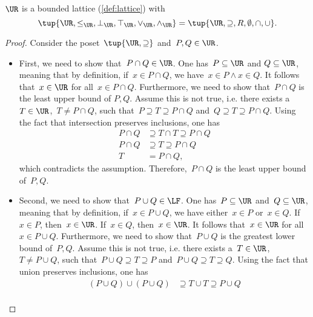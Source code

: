 \begin{lemma}
    \label{lemma:u_bounded_lat}
    $\UR$ is a bounded lattice (\cref{def:lattice}) with
    \begin{equation}
        \tup{\UR,\leq_{\UR},\bot_{\UR},\top_{\UR},\vee_{\UR},\wedge_{\UR}}=\tup{\UR,\supseteq,R,\emptyset,\cap,\cup}.
    \end{equation}
    \begin{proof}
        Consider the poset~$\tup{\UR,\supseteq}$ and~$P,Q\in \UR$.
        \begin{itemize}
            \item First, we need to show that~$P\cap Q\in \UR$. One has~$P \subseteq \UR$ and $Q\subseteq \UR$, meaning that by definition, if~$x\in P\cap Q$, we have~$x\in P \wedge x\in Q$. It follows that~$x\in \UR$ for all~$x\in P\cap Q$. Furthermore, we need to show that~$P\cap Q$ is the least upper bound of $P,Q$. Assume this is not true, i.e. there exists a~$T\in \UR$,~$T\neq P\cap Q$, such that~$P\supseteq T\supseteq P\cap Q$ and~$Q\supseteq T\supseteq P\cap Q$. Using the fact that intersection preserves inclusions, one has
            \begin{equation}
                \begin{aligned}
                    P\cap Q &\supseteq T\cap T \supseteq P\cap Q\\
                    P\cap Q &\supseteq T \supseteq P\cap Q\\
                    T&= P\cap Q,
                \end{aligned}
            \end{equation}
            which contradicts the assumption. Therefore,~$P\cap Q$ is the least upper bound of~$P,Q$.
            \item Second, we need to show that~$P\cup Q\in \LF$. One has~$P\subseteq \UR$ and~$Q\subseteq \UR$, meaning that by definition, if~$x\in P\cup Q$, we have either~$x\in P$ or~$x\in Q$. If~$x\in P$, then~$x\in \UR$. If~$x\in Q$, then~$x\in \UR$. It follows that~$x\in \UR$ for all~$x\in P\cup Q$. Furthermore, we need to show that~$P\cup Q$ is the greatest lower bound of~$P,Q$. Assume this is not true, i.e. there exists a~$T\in \UR$,~$T\neq P\cup Q$, such that~$P\cup Q\supseteq T\supseteq P$ and~$P\cup Q\supseteq T\supseteq Q$. Using the fact that union preserves inclusions, one has
            \begin{equation}
                \begin{aligned}
                (P\cup Q)
                    \cup (P\cup Q) &\supseteq T \cup T \supseteq P\cup Q\\

\end{aligned}
\end{equation}
\end{itemize}
\end{proof}
\end{lemma}
